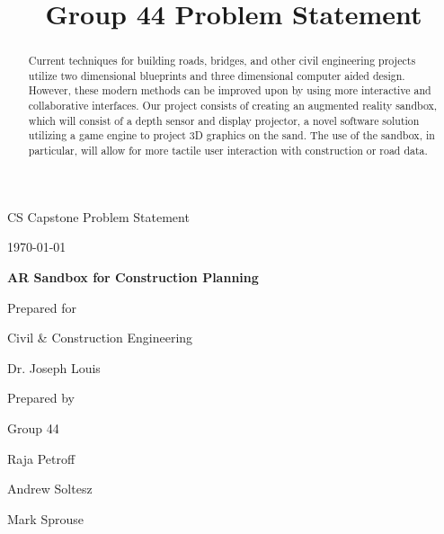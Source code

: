 \documentclass[onecolumn, draftclsnofoot,10pt, compsoc]{IEEEtran}
\title{Group 44 Problem Statement}
\def \CapstoneTeamName{		The Cleverly Named Team}
\def \CapstoneTeamNumber{		44}
\def \GroupMemberOne{			Raja Petroff}
\def \GroupMemberTwo{			Andrew Soltesz}
\def \GroupMemberThree{			Mark Sprouse}
\def \CapstoneProjectName{		AR Sandbox for Construction Planning}
\def \CapstoneSponsorCompany{	Civil \& Construction Engineering}
\def \CapstoneSponsorPerson{		Dr. Joseph Louis}
\def \DocType{		Problem Statement
				}
\newcommand{\NameSigPair}[1]{\par
\makebox[2.75in][r]{#1} \hfil 	\makebox[3.25in]{\makebox[2.25in]{\hrulefill} \hfill		\makebox[.75in]{\hrulefill}}
\par\vspace{-12pt} \textit{\tiny\noindent
\makebox[2.75in]{} \hfil		\makebox[3.25in]{\makebox[2.25in][r]{Signature} \hfill	\makebox[.75in][r]{Date}}}}
\renewcommand{\NameSigPair}[1]{#1}
\begin{document}
\begin{titlepage}
    \begin{singlespace}
        \hfill 
        \par\vspace{.2in}
        \centering
        \scshape{
            \huge CS Capstone \DocType \par
            {\large\today}\par
            \vspace{.5in}
            \textbf{\Huge\CapstoneProjectName}\par
            \vfill
            {\large Prepared for}\par
            \Huge \CapstoneSponsorCompany\par
            \vspace{5pt}
            {\Large\NameSigPair{\CapstoneSponsorPerson}\par}
            {\large Prepared by }\par
            Group\CapstoneTeamNumber\par
            \vspace{5pt}
            {\Large
                \NameSigPair{\GroupMemberOne}\par
                \NameSigPair{\GroupMemberTwo}\par
                \NameSigPair{\GroupMemberThree}\par
            }
            \vspace{20pt}
        }
        \begin{abstract}
        	Current techniques for building roads, bridges, and other civil engineering projects utilize two dimensional blueprints and three dimensional computer aided design.
			However, these modern methods can be improved upon by using more interactive and collaborative interfaces.
			Our project consists of creating an augmented reality sandbox, which will consist of a depth sensor and display projector, a novel software solution utilizing a game engine to project 3D graphics on the sand.
			The use of the sandbox, in particular, will allow for more tactile user interaction with construction or road data.
        \end{abstract}     
    \end{singlespace}
\end{titlepage}
\newpage
{}
\tableofcontents
\clearpage
\end{document}
